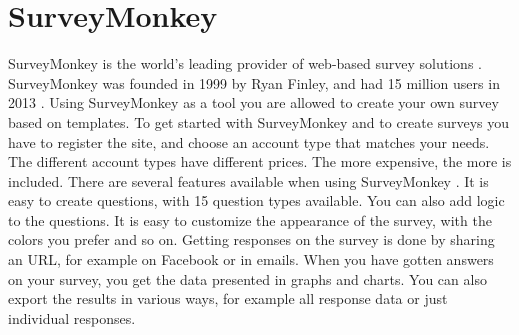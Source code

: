 \section{SurveyMonkey}
\label{sec:sm}
SurveyMonkey is the world's leading provider of web-based survey solutions \cite{surveymonkeyaboutus}. SurveyMonkey was founded in 1999 by Ryan Finley, and had 15 million users in 2013 \cite{surveymonkeywiki}. Using SurveyMonkey as a tool you are allowed to create your own survey based on templates. To get started with SurveyMonkey and to create surveys you have to register the site, and choose an account type that matches your needs. The different account types have different prices. The more expensive, the more is included. There are several features available when using SurveyMonkey \cite{surveymonkeyfeatures}. It is easy to create questions, with 15 question types available. You can also add logic to the questions. It is easy to customize the appearance of the survey, with the colors you prefer and so on. Getting responses on the survey is done by sharing an URL, for example on Facebook or in emails. When you have gotten answers on your survey, you get the data presented in graphs and charts. You can also export the results in various ways, for example all response data or just individual responses.

